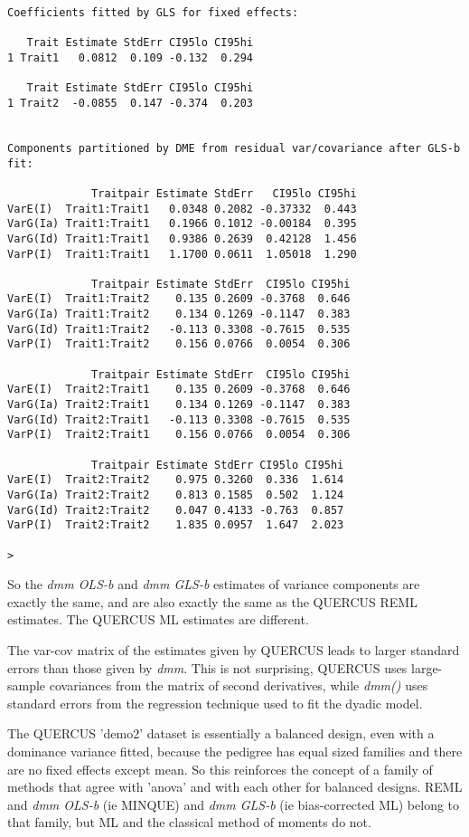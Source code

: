 \documentclass[titlepage]{article}  %
\begin{document}
\begin{verbatim}
Coefficients fitted by GLS for fixed effects:

   Trait Estimate StdErr CI95lo CI95hi
1 Trait1   0.0812  0.109 -0.132  0.294

   Trait Estimate StdErr CI95lo CI95hi
1 Trait2  -0.0855  0.147 -0.374  0.203


Components partitioned by DME from residual var/covariance after GLS-b fit:

             Traitpair Estimate StdErr   CI95lo CI95hi
VarE(I)  Trait1:Trait1   0.0348 0.2082 -0.37332  0.443
VarG(Ia) Trait1:Trait1   0.1966 0.1012 -0.00184  0.395
VarG(Id) Trait1:Trait1   0.9386 0.2639  0.42128  1.456
VarP(I)  Trait1:Trait1   1.1700 0.0611  1.05018  1.290

             Traitpair Estimate StdErr  CI95lo CI95hi
VarE(I)  Trait1:Trait2    0.135 0.2609 -0.3768  0.646
VarG(Ia) Trait1:Trait2    0.134 0.1269 -0.1147  0.383
VarG(Id) Trait1:Trait2   -0.113 0.3308 -0.7615  0.535
VarP(I)  Trait1:Trait2    0.156 0.0766  0.0054  0.306

             Traitpair Estimate StdErr  CI95lo CI95hi
VarE(I)  Trait2:Trait1    0.135 0.2609 -0.3768  0.646
VarG(Ia) Trait2:Trait1    0.134 0.1269 -0.1147  0.383
VarG(Id) Trait2:Trait1   -0.113 0.3308 -0.7615  0.535
VarP(I)  Trait2:Trait1    0.156 0.0766  0.0054  0.306

             Traitpair Estimate StdErr CI95lo CI95hi
VarE(I)  Trait2:Trait2    0.975 0.3260  0.336  1.614
VarG(Ia) Trait2:Trait2    0.813 0.1585  0.502  1.124
VarG(Id) Trait2:Trait2    0.047 0.4133 -0.763  0.857
VarP(I)  Trait2:Trait2    1.835 0.0957  1.647  2.023

>
\end{verbatim}

So the {\em dmm OLS-b} and {\em dmm GLS-b} estimates of variance components are exactly the same, and are also exactly the same as the QUERCUS REML estimates. The QUERCUS ML estimates are different. 

The var-cov matrix of the estimates given by QUERCUS leads to larger standard errors than those given by {\em dmm}. This is not surprising, QUERCUS uses large-sample covariances from the matrix of second derivatives, while {\em dmm()} uses standard errors from the regression technique used to fit the dyadic model. 

The QUERCUS 'demo2' dataset is essentially a balanced design, even with a dominance variance fitted, because the pedigree has equal sized families and there are no fixed effects except mean. So this reinforces the concept of a family of methods that agree with 'anova' and with each other for balanced designs. REML and {\em dmm OLS-b} (ie MINQUE) and {\em dmm GLS-b} (ie bias-corrected ML) belong to that family, but ML and the classical method of moments do not. 
\end{document}
